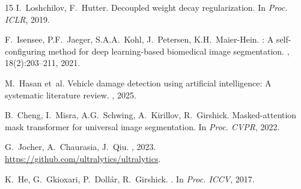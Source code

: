\documentclass[10pt,twocolumn]{article}
\begin{document}
{\begin{thebibliography}{15}
I.~Loshchilov, F.~Hutter.
\newblock Decoupled weight decay regularization.
\newblock In {\em Proc. ICLR}, 2019.

F.~Isensee, P.F.~Jaeger, S.A.A.~Kohl, J.~Petersen, K.H.~Maier-Hein.
: A self-configuring method for deep learning-based biomedical image segmentation.
, 18(2):203--211, 2021.

M.~Hasan et~al.
\newblock Vehicle damage detection using artificial intelligence: A systematic literature review.
, 2025.

B.~Cheng, I.~Misra, A.G.~Schwing, A.~Kirillov, R.~Girshick.
\newblock Masked-attention mask transformer for universal image segmentation.
\newblock In {\em Proc. CVPR}, 2022.

G.~Jocher, A.~Chaurasia, J.~Qiu.
, 2023.
\newblock \url{https://github.com/ultralytics/ultralytics}.

K.~He, G.~Gkioxari, P.~Doll\'{a}r, R.~Girshick.
.
\newblock In {\em Proc. ICCV}, 2017.

\end{thebibliography}
}
\end{document}
